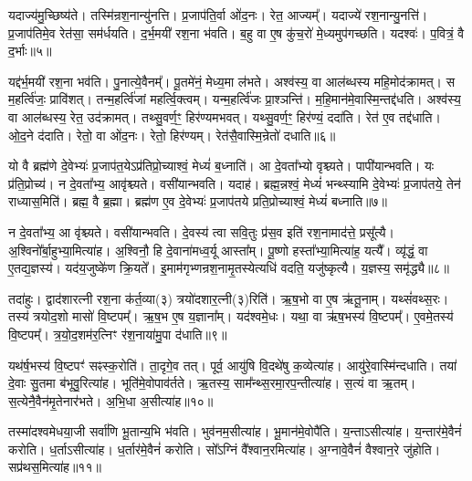 यदाज्य॑मु॒च्छिष्य॑ते।
तस्मि॑न्रश॒नान्यु॑नत्ति।
प्र॒जा\-प॑ति॒र्वा ओ॑द॒नः।
रेत॒ आज्यम्᳚।
यदाज्ये॑ रश॒नान्यु॒नत्ति॑।
प्र॒जा\-प॑तिमे॒व रेत॑सा॒ सम॑र्धयति।
द॒र्भ॒मयी॑ रश॒ना भ॑वति।
ब॒हु वा ए॒ष कु॑च॒रो॑ मे॒ध्यमुप॑गच्छति।
यदश्वः॑।
प॒वित्रं॒ वै द॒र्भाः॥५॥

यद्द॑र्भ॒मयी॑ रश॒ना भव॑ति।
पु॒नात्ये॒वैनम्᳚।
पू॒तमे॑नं॒ मेध्य॒मा ल॑भते।
अश्व॑स्य॒ वा आल॑ब्धस्य महि॒मोद॑क्रामत्।
स म॒हर्त्वि॑जः॒ प्रावि॑शत्।
तन्म॒हर्त्वि॑जां महर्त्वि॒क्त्वम्।
यन्म॒हर्त्वि॑जः प्रा॒श्ञन्ति॑।
म॒हि॒मान॑मे॒वास्मि॒न्तद्द॑धति।
अश्व॑स्य॒ वा आल॑ब्धस्य॒ रेत॒ उद॑क्रामत्।
तथ्सु॒वर्ण॒ꣳ॒ हिर॑ण्यमभवत्।
यथ्सु॒वर्ण॒ꣳ॒ हिर॑ण्यं॒ ददा॑ति।
रेत॑ ए॒व तद्द॑धाति।
ओ॒द॒ने द॑दाति।
रेतो॒ वा ओ॑द॒नः।
रेतो॒ हिर॑ण्यम्।
रेत॑सै॒वास्मि॒न्रेतो॑ दधाति॥६॥\anuvakamend[द॒धा॒ति॒ रु॒न्धे॒ द॒र्भा अ॑भव॒थ्षट् च॑]

यो वै ब्रह्म॑णे दे॒वेभ्यः॑ प्र॒जा\-प॑त॒ये\-ऽप्र॑तिप्रो॒च्याश्वं॒ मेध्यं॑ ब॒ध्नाति॑।
आ दे॒वता᳚भ्यो वृश्च्यते।
पापी॑यान्भवति।
यः प्र॑ति॒प्रोच्य॑।
न दे॒वता᳚भ्य॒ आवृ॑श्च्यते।
वसी॑यान्भवति।
यदाह॑।
ब्रह्म॒न्नश्वं॒ मेध्यं॑ भन्थ्स्यामि दे॒वेभ्यः॑ प्र॒जा\-प॑तये॒ तेन॑ राध्यास॒मिति॑।
ब्रह्म॒ वै ब्र॒ह्मा।
ब्रह्म॑ण ए॒व दे॒वेभ्यः॑ प्र॒जा\-प॑तये प्रति॒प्रोच्याश्वं॒ मेध्यं॑ बध्नाति॥७॥

न दे॒वता᳚भ्य॒ आ वृ॑श्च्यते।
वसी॑यान्भवति।
दे॒वस्य॑ त्वा सवि॒तुः प्र॑स॒व इति॑ रश॒नामाद॑त्ते॒ प्रसू᳚त्यै।
अ॒श्विनो᳚र्बा॒हुभ्या॒मित्या॑ह।
अ॒श्विनौ॒ हि दे॒वाना॑मध्व॒र्यू आस्ता᳚म्।
पू॒ष्णो हस्ता᳚भ्या॒मित्या॑ह॒ यत्यै᳚।
व्यृ॑द्धं॒ वा ए॒तद्य॒ज्ञस्य॑।
यद॑य॒जुष्के॑ण क्रि॒यते᳚।
इ॒माम॑गृभ्णन्रश॒नामृ॒तस्ये\-त्यधि॑ वदति॒ यजु॑ष्कृत्यै।
य॒ज्ञस्य॒ समृ॑द्ध्यै॥८॥

तदा॑हुः।
द्वाद॑शारत्नी रश॒ना क॑र्त॒व्या(३) त्रयो॑दशार॒त्नी(३)\-रिति॑।
ऋ॒ष॒भो वा ए॒ष ऋ॑तू॒नाम्।
यथ्सं॑वथ्स॒रः।
तस्य॑ त्रयोद॒शो मासो॑ वि॒ष्टपम्᳚।
ऋ॒ष॒भ ए॒ष य॒ज्ञाना᳚म्।
यद॑श्वमे॒धः।
यथा॒ वा ऋ॑ष॒भस्य॑ वि॒ष्टपम्᳚।
ए॒वमे॒तस्य॑ वि॒ष्टपम्᳚।
त्र॒यो॒द॒शम॑र॒त्निꣳ र॑श॒नाया॑मु॒पा द॑धाति॥९॥

यथ॑र्\mbox{}ष॒भस्य॑ वि॒ष्टपꣳ॑ सꣴस्क॒रोति॑।
ता॒दृगे॒व तत्।
पूर्व॒ आयु॑षि वि॒दथे॑षु क॒व्येत्या॑ह।
आयु॑रे॒वास्मि॑न्दधाति।
तया॑ दे॒वाः सु॒तमा ब॑भूवु॒रित्या॑ह।
भूति॑मे॒वोपाव॑र्तते।
ऋ॒तस्य॒ साम᳚न्थ्स॒रमा॒रप॒न्तीत्या॑ह।
स॒त्यं वा ऋ॒तम्।
स॒त्येनै॒वैन॑मृ॒तेनार॑भते।
अ॒भि॒धा अ॒सीत्या॑ह॥१०॥

तस्मा॑दश्वमेधया॒जी सर्वा॑णि भू॒तान्य॒भि भ॑वति।
भुव॑नम॒सी\-त्या॑ह।
भू॒मान॑मे॒वोपै॑ति।
य॒न्ता\-ऽसीत्या॑ह।
य॒न्तार॑मे॒वैनं॑ करोति।
ध॒र्ता\-ऽसीत्या॑ह।
ध॒र्तार॑मे॒वैनं॑ करोति।
सो᳚ऽग्निं वै᳚श्वान॒रमित्या॑ह।
अ॒ग्नावे॒वैनं॑ वैश्वान॒रे जु॑होति।
सप्र॑थस॒मित्या॑ह॥११॥

